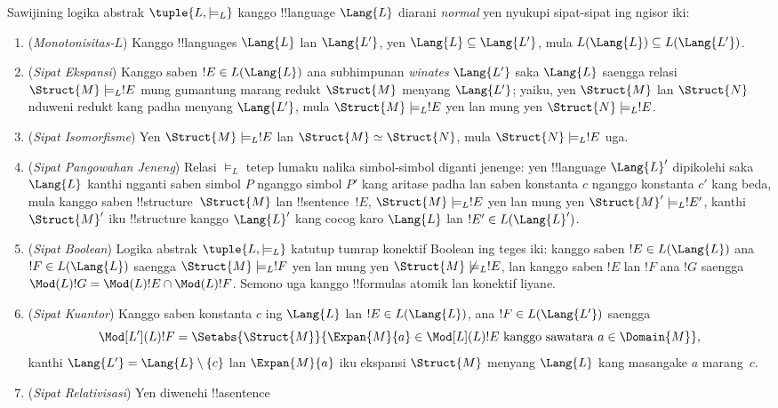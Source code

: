 \documentclass[../../../include/open-logic-section]{subfiles}
\begin{document}
\begin{defn}
Sawijining logika abstrak $\tuple{L,\models_L}$ kanggo
!!{language} $\Lang{L}$ diarani \emph{normal} yen nyukupi
sipat-sipat ing ngisor iki:
\begin{enumerate}
\item (\emph{Monotonisitas-$L$}) Kanggo !!{language}s $\Lang{L}$
  lan $\Lang{L'}$, yen $\Lang{L} \subseteq \Lang{L'}$, mula
  $L(\Lang{L}) \subseteq L(\Lang{L'})$.
\item (\emph{Sipat Ekspansi}) Kanggo saben $!E \in L(\Lang{L})$
  ana subhimpunan \emph{winates} $\Lang{L'}$ saka $\Lang{L}$
  saengga relasi $\Struct{M} \models_L !E$ mung gumantung marang
  redukt $\Struct{M}$ menyang $\Lang{L'}$; yaiku, yen
  $\Struct{M}$ lan $\Struct{N}$ nduweni redukt kang padha menyang
  $\Lang{L'}$, mula $\Struct{M} \models_L !E$ yen lan mung yen
  $\Struct{N} \models_L !E$.
\item (\emph{Sipat Isomorfisme}) Yen $\Struct{M} \models_L !E$
  lan $\Struct{M} \simeq \Struct{N}$, mula $\Struct{N} \models_L
  !E$ uga.
\item (\emph{Sipat Pangowahan Jeneng}) Relasi $\models_L$ tetep
  lumaku nalika simbol-simbol diganti jenenge: yen !!{language}
  $\Lang{L}'$ dipikolehi saka $\Lang{L}$ kanthi ngganti saben
  simbol $P$ nganggo simbol $P'$ kang aritase padha lan saben
  konstanta $c$ nganggo konstanta $c'$ kang beda, mula kanggo
  saben !!{structure}~$\Struct{M}$ lan !!{sentence}~$!E$,
  $\Struct{M} \models_L !E$ yen lan mung yen
  $\Struct{M}' \models_L !E'$, kanthi $\Struct{M}'$ iku
  !!{structure} kanggo $\Lang{L}'$ kang cocog karo
  $\Lang{L}$ lan $!E' \in L(\Lang{L}')$.
\item (\emph{Sipat Boolean}) Logika abstrak $\tuple{L,
  \models_L}$ katutup tumrap konektif Boolean ing teges iki:
  kanggo saben $!E \in L(\Lang{L})$ ana $!F \in
  L(\Lang{L})$ saengga $\Struct{M} \models_L !F$ yen lan mung
  yen $\Struct{M} \not\models_L !E$, lan kanggo saben $!E$
  lan $!F$ ana $!G$ saengga $\Mod(L){!G} = \Mod(L){!E}
  \cap \Mod(L){!F}$. Semono uga kanggo !!{formula}s atomik
  lan konektif liyane.
\item (\emph{Sipat Kuantor}) Kanggo saben konstanta $c$ ing
  $\Lang{L}$ lan $!E \in L(\Lang{L})$, ana $!F \in
  L(\Lang{L'})$ saengga
  \[
  \Mod[L'](L){!F} = \Setabs{\Struct{M}}{\Expan{M}{a} \in
  \Mod[L](L){!E} \text{ kanggo sawatara } a \in \Domain{M}},
  \]
  kanthi $\Lang{L'} = \Lang{L} \setminus \{c\}$ lan
  $\Expan{M}{a}$ iku ekspansi $\Struct{M}$ menyang $\Lang{L}$
  kang masangake $a$ marang~$c$.
\item (\emph{Sipat Relativisasi}) Yen diwenehi !!a{sentence}

\end{enumerate}
\end{defn}
\end{document}
